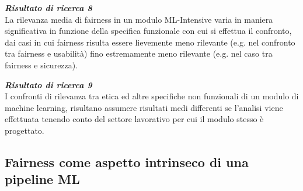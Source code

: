 	\begin{center}
	
        \begin{tcolorbox}[width=\textwidth, colframe=black, colback=Gray]
    			\begin{minipage}{\textwidth}
    				\textit{\faKey  \textbf{ Risultato di ricerca 8}}\\
    			La rilevanza media di fairness in un modulo ML-Intensive varia in maniera significativa in funzione della specifica funzionale con cui si effettua il confronto, dai casi in cui fairness risulta essere lievemente meno rilevante (e.g. nel confronto tra fairness e usabilità) fino estremamente meno rilevante (e.g. nel caso tra fairness e sicurezza).
    			\end{minipage}
		\end{tcolorbox}
	\end{center}
	
	\begin{center}
	
        \begin{tcolorbox}[width=\textwidth, colframe=black, colback=Gray]
    			\begin{minipage}{\textwidth}
    				\textit{\faKey  \textbf{ Risultato di ricerca 9}}\\
    			I confronti di rilevanza tra etica ed altre specifiche non funzionali di un modulo di machine learning, risultano assumere risultati medi differenti se l'analisi viene effettuata tenendo conto del settore lavorativo per cui il modulo stesso è progettato.
    			\end{minipage}
		\end{tcolorbox}
	\end{center}
	
    \subsection{Fairness come aspetto intrinseco di una pipeline ML}

    	\begin{center}
    	\hspace*{-5mm}%
    \end{center}
    

